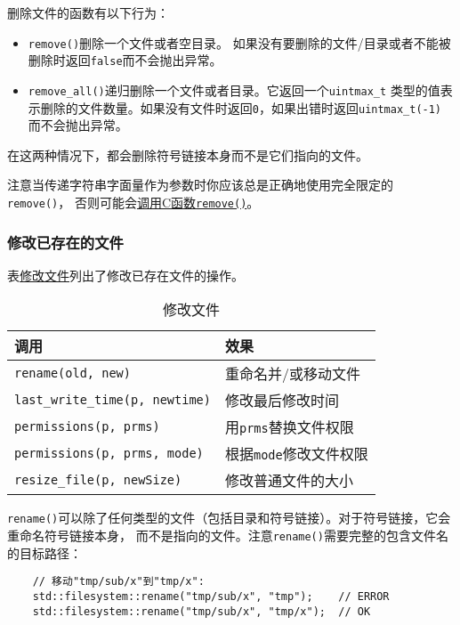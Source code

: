 删除文件的函数有以下行为：
\begin{itemize}
    \item \texttt{remove()}删除一个文件或者空目录。
    如果没有要删除的文件/目录或者不能被删除时返回\texttt{false}而不会抛出异常。
    \item \texttt{remove\_all()}递归删除一个文件或者目录。它返回一个\texttt{uintmax\_t}
    类型的值表示删除的文件数量。如果没有文件时返回\texttt{0}，如果出错时返回\texttt{uintmax\_t(-1)}
    而不会抛出异常。
\end{itemize}
在这两种情况下，都会删除符号链接本身而不是它们指向的文件。

注意当传递字符串字面量作为参数时你应该总是正确地使用完全限定的\texttt{remove()}，
否则可能会\hyperref[ADL导致意外行为]{调用C函数\texttt{remove()}}。

\subsubsection{修改已存在的文件}\label{ch20.4.4.2}
表\hyperref[t20.17]{修改文件}列出了修改已存在文件的操作。
\begin{table}[ht]
    \centering
    \begin{tabular}{l|l}
        \hline
        \textbf{调用}                            & \textbf{效果}           \\
        \hline
        \texttt{rename(old, new)}              & 重命名并/或移动文件            \\
        \texttt{last\_write\_time(p, newtime)} & 修改最后修改时间              \\
        \texttt{permissions(p, prms)}          & 用\texttt{prms}替换文件权限  \\
        \texttt{permissions(p, prms, mode)}    & 根据\texttt{mode}修改文件权限 \\
        \texttt{resize\_file(p, newSize)}      & 修改普通文件的大小             \\
        \hline
    \end{tabular}
    \caption{修改文件}
    \label{t20.17}
\end{table}

\texttt{rename()}可以除了任何类型的文件（包括目录和符号链接）。对于符号链接，它会重命名符号链接本身，
而不是指向的文件。注意\texttt{rename()}需要完整的包含文件名的目标路径：
\begin{lstlisting}
    // 移动"tmp/sub/x"到"tmp/x":
    std::filesystem::rename("tmp/sub/x", "tmp");    // ERROR
    std::filesystem::rename("tmp/sub/x", "tmp/x");  // OK
\end{lstlisting}

